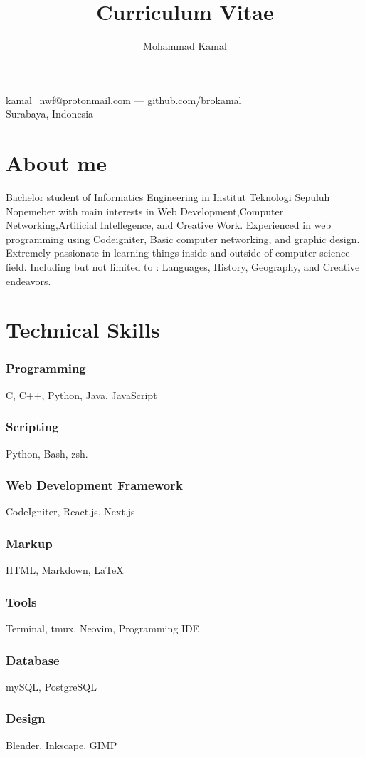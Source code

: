 \documentclass{article}
\makeatletter
\renewcommand{\maketitle}{
\begin{center}
{\huge\bfseries
\theauthor}




\vspace{.25em}

kamal\_nwf@protonmail.com --- github.com/brokamal \\
Surabaya, Indonesia 

\end{center}

}
\makeatother
\begin{document}
\title{Curriculum Vitae}
\author{Mohammad Kamal}

\maketitle

\section{About me}
Bachelor student of Informatics Engineering in Institut Teknologi Sepuluh Nopemeber with main interests in Web Development,Computer Networking,Artificial Intellegence, and Creative Work. Experienced in web programming using Codeigniter, Basic computer networking, and graphic design. 
\\[1em]
Extremely passionate in learning things inside and outside of computer science field. Including but not limited to : Languages, History, Geography, and Creative endeavors. 
\section{Technical Skills}



\subsubsection{Programming}
C, C++, Python, Java, JavaScript
\subsubsection{Scripting}
Python, Bash, zsh.
\subsubsection{Web Development Framework}
CodeIgniter, React.js, Next.js
\subsubsection{Markup}
HTML, Markdown, LaTeX
\subsubsection{Tools}
Terminal, tmux, Neovim, Programming IDE
\subsubsection{Database}
mySQL, PostgreSQL
\subsubsection{Design}
Blender, Inkscape, GIMP
\end{document}
